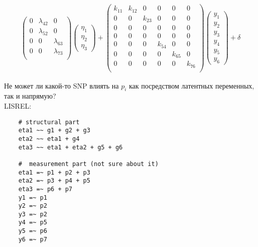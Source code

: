 \documentclass[a4paper,12pt]{article}
\begin{document}
\begin{gather*}
\begin{pmatrix}
	0 & \lambda_{42} & 0 \\
	0 & \lambda_{52} & 0 \\
	0 & 0 & \lambda_{63} \\
	0 & 0 & \lambda_{73} \\
\end{pmatrix} 
\begin{pmatrix}
	\eta_1 \\
	\eta_2 \\
	\eta_3
\end{pmatrix} + 
\begin{pmatrix}
	k_{11} & k_{12} & 0 & 0 & 0 & 0 \\
	0 & 0 & k_{23} & 0 & 0 & 0 \\
	0 & 0 & 0 & 0 & 0 & 0 \\
	0 & 0 & 0 & 0 & 0 & 0 \\
	0 & 0 & 0 & k_{54} & 0 & 0 \\
	0 & 0 & 0 & 0 & k_{65} & 0 \\
	0 & 0 & 0 & 0 & 0 & k_{76} \\
\end{pmatrix}
\begin{pmatrix}
	y_1 \\ y_2 \\ y_3 \\ y_4 \\ y_5 \\ y_6
\end{pmatrix} + \delta
\end{gather*}

Не может ли какой-то SNP влиять на $p_i$ как посредством латентных переменных, так и напрямую? \\

LISREL:

\begin{verbatim}
	# structural part
	eta1 ~~ g1 + g2 + g3
	eta2 ~~ eta1 + g4
	eta3 ~~ eta1 + eta2 + g5 + g6
	
	#  measurement part (not sure about it)
	eta1 =~ p1 + p2 + p3
	eta2 =~ p3 + p4 + p5
	eta3 =~ p6 + p7
	y1 =~ p1
	y2 =~ p2
	y3 =~ p2
	y4 =~ p5
	y5 =~ p6
	y6 =~ p7
\end{verbatim}

	
\end{document}
